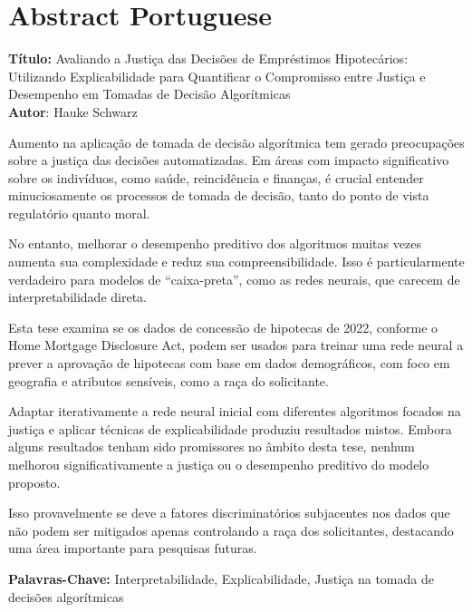 \chapter*{Abstract Portuguese}\label{abstractp}

\noindent
\textbf{Título:} Avaliando a Justiça das Decisões de Empréstimos Hipotecários: \\
Utilizando Explicabilidade para Quantificar o Compromisso entre Justiça e Desempenho em Tomadas de Decisão Algorítmicas\\
\textbf{Autor}: Hauke Schwarz
\vspace{1em}

Aumento na aplicação de tomada de decisão algorítmica tem gerado preocupações sobre a justiça das decisões automatizadas. Em áreas com impacto significativo sobre os indivíduos, como saúde, reincidência e finanças, é crucial entender minuciosamente os processos de tomada de decisão, tanto do ponto de vista regulatório quanto moral.

No entanto, melhorar o desempenho preditivo dos algoritmos muitas vezes aumenta sua complexidade e reduz sua compreensibilidade. Isso é particularmente verdadeiro para modelos de “caixa-preta”, como as redes neurais, que carecem de interpretabilidade direta.

Esta tese examina se os dados de concessão de hipotecas de 2022, conforme o Home Mortgage Disclosure Act, podem ser usados para treinar uma rede neural a prever a aprovação de hipotecas com base em dados demográficos, com foco em geografia e atributos sensíveis, como a raça do solicitante.

Adaptar iterativamente a rede neural inicial com diferentes algoritmos focados na justiça e aplicar técnicas de explicabilidade produziu resultados mistos. Embora alguns resultados tenham sido promissores no âmbito desta tese, nenhum melhorou significativamente a justiça ou o desempenho preditivo do modelo proposto.

Isso provavelmente se deve a fatores discriminatórios subjacentes nos dados que não podem ser mitigados apenas controlando a raça dos solicitantes, destacando uma área importante para pesquisas futuras.

\vspace{3em}

\textbf{Palavras-Chave:} Interpretabilidade, Explicabilidade, Justiça na tomada de decisões algorítmicas \\